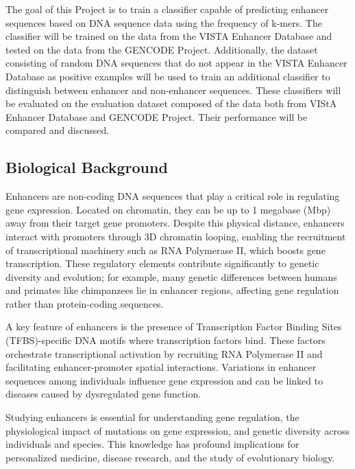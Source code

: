 \documentclass[11pt, a4paper, hidelinks]{article}
\begin{document}
The goal of this Project is to train a classifier capable of predicting enhancer sequences based on DNA sequence data using the frequency of k-mers.
The classifier will be trained on the data from the VISTA Enhancer Database and tested on the data from the GENCODE Project.
Additionally, the dataset consisting of random DNA sequences that do not appear in the VISTA Enhancer Database as positive examples will be used to train an additional classifier to distinguish between enhancer and non-enhancer sequences.
These classifiers will be evaluated on the evaluation dataset composed of the data both from VIStA Enhancer Database and GENCODE Project.
Their performance will be compared and discussed.

\subsection{Biological Background}\label{subsec:biological-background}

Enhancers are non-coding DNA sequences that play a critical role in regulating gene expression. 
Located on chromatin, they can be up to 1 megabase (Mbp) away from their target gene promoters. 
Despite this physical distance, enhancers interact with promoters through 3D chromatin looping, enabling the recruitment of transcriptional machinery such as RNA Polymerase II, which boosts gene transcription. 
These regulatory elements contribute significantly to genetic diversity and evolution; for example, many genetic differences between humans and primates like chimpanzees lie in enhancer regions, affecting gene regulation rather than protein-coding sequences.

A key feature of enhancers is the presence of Transcription Factor Binding Sites (TFBS)-specific DNA motifs where transcription factors bind.
These factors orchestrate transcriptional activation by recruiting RNA Polymerase II and facilitating enhancer-promoter spatial interactions.
Variations in enhancer sequences among individuals influence gene expression and can be linked to diseases caused by dysregulated gene function.

Studying enhancers is essential for understanding gene regulation, the physiological impact of mutations on gene expression, and genetic diversity across individuals and species.
This knowledge has profound implications for personalized medicine, disease research, and the study of evolutionary biology.
\end{document}
